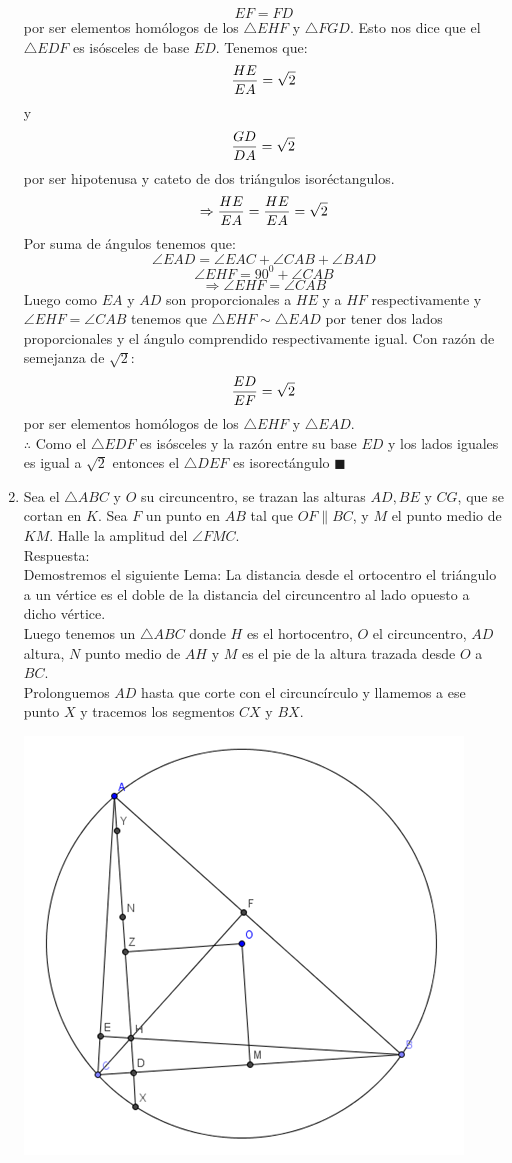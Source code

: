 \documentclass{book}
\begin{document}
\begin{enumerate}
$$EF=FD$$
por ser elementos homólogos de los $\triangle EHF$ y $\triangle FGD$. Esto nos dice que el $\triangle EDF$ es isósceles de base $ED$.
Tenemos que:
$${HE\over EA}=\sqrt{2}$$
y
$${GD\over DA}=\sqrt{2}$$
por ser hipotenusa y cateto de dos triángulos isoréctangulos.
$$\Rightarrow{HE\over EA}={HE\over EA}=\sqrt{2}$$
Por suma de ángulos tenemos que:
$$\angle EAD=\angle EAC+\angle CAB+\angle BAD$$
$$\angle EHF=90^0+\angle CAB$$
$$\Rightarrow\angle EHF=\angle CAB$$
Luego como $EA$ y $AD$ son proporcionales a $HE$ y a $HF$ respectivamente y $\angle EHF=\angle CAB$ tenemos que $\triangle EHF\sim\triangle EAD$ por tener dos lados proporcionales y el ángulo comprendido respectivamente igual. Con razón de semejanza de $\sqrt{2}$:
$${ED\over EF}=\sqrt{2}$$
por ser elementos homólogos de los $\triangle EHF$ y $\triangle EAD$.\\	
$\therefore$ Como el $\triangle EDF$ es isósceles y la razón entre su base $ED$ y los lados iguales es igual a $\sqrt{2}$ entonces el $\triangle DEF$ es isorectángulo $\blacksquare$\\
				\item Sea el $\triangle ABC$  y $O$ su circuncentro, se trazan las alturas $AD, BE$ y $CG$, que se cortan en $K$. Sea $F$ un punto en $AB$ tal que $OF \| BC$, y $M$ el punto medio de $KM$. Halle la amplitud del $\angle FMC$.\\
					Respuesta:\\
					Demostremos el siguiente Lema:
La distancia desde el ortocentro el triángulo a un vértice es el doble de la distancia del circuncentro al lado opuesto a dicho vértice.\\
Luego tenemos un $\triangle ABC$ donde $H$ es el hortocentro, $O$ el circuncentro, $AD$ altura, $N$ punto medio de $AH$ y $M$ es el pie de la altura trazada desde $O$ a $BC$.\\ 
Prolonguemos $AD$ hasta que corte con el circuncírculo y llamemos a ese punto $X$ y tracemos los segmentos $CX$ y $BX$.
					\begin{center}
						\includegraphics[scale=1]{imagenes/Geometria/21,1.png}

\end{center}
\end{enumerate}
\end{document}

